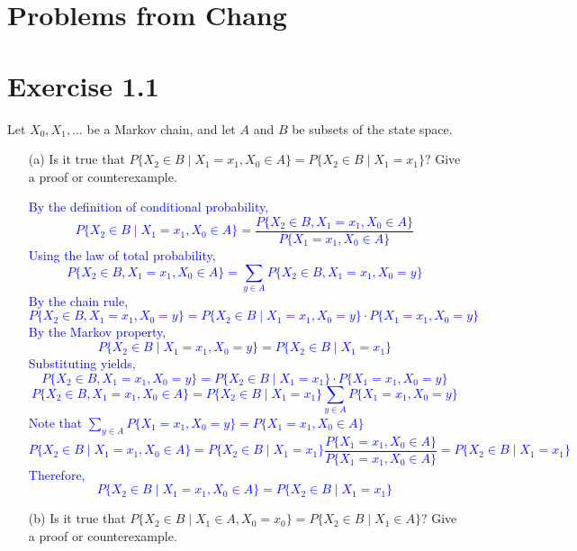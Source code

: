 \documentclass{article}
\begin{document}
\begin{enumerate}
\end{enumerate}

\section*{Problems from Chang}

\section*{Exercise 1.1}
Let $X_0, X_1, \ldots$ be a Markov chain, and let $A$ and $B$ be subsets of the state space.

\begin{enumerate}
    \item[(a)] Is it true that $P\{X_2 \in B \mid X_1 = x_1, X_0 \in A\} = P\{X_2 \in B \mid X_1 = x_1\}$? Give a proof or counterexample.

    \textcolor{blue}{By the definition of conditional probability,
$$P\{X_2 \in B \mid X_1 = x_1, X_0 \in A\} = \frac{P\{X_2 \in B, X_1 = x_1, X_0 \in A\}}{P\{X_1 = x_1, X_0 \in A\}}$$
Using the law of total probability,
$$P\{X_2 \in B, X_1 = x_1, X_0 \in A\} = \sum_{y \in A} P\{X_2 \in B, X_1 = x_1, X_0 = y\}$$
By the chain rule,
$$P\{X_2 \in B, X_1 = x_1, X_0 = y\} = P\{X_2 \in B \mid X_1 = x_1, X_0 = y\} \cdot P\{X_1 = x_1, X_0 = y\}$$
By the Markov property,
$$P\{X_2 \in B \mid X_1 = x_1, X_0 = y\} = P\{X_2 \in B \mid X_1 = x_1\}$$
Substituting yields,
$$P\{X_2 \in B, X_1 = x_1, X_0 = y\} = P\{X_2 \in B \mid X_1 = x_1\} \cdot P\{X_1 = x_1, X_0 = y\}$$
$$P\{X_2 \in B, X_1 = x_1, X_0 \in A\} = P\{X_2 \in B \mid X_1 = x_1\} \sum_{y \in A} P\{X_1 = x_1, X_0 = y\}$$
Note that $\sum_{y \in A} P\{X_1 = x_1, X_0 = y\} = P\{X_1 = x_1, X_0 \in A\}$ \\
$$P\{X_2 \in B \mid X_1 = x_1, X_0 \in A\} = P\{X_2 \in B \mid X_1 = x_1\} \frac{P\{X_1 = x_1, X_0 \in A\}}{P\{X_1 = x_1, X_0 \in A\}} = P\{X_2 \in B \mid X_1 = x_1\}$$
Therefore, $$P\{X_2 \in B \mid X_1 = x_1, X_0 \in A\} = P\{X_2 \in B \mid X_1 = x_1\}$$}


    \item[(b)] Is it true that $P\{X_2 \in B \mid X_1 \in A, X_0 = x_0\} = P\{X_2 \in B \mid X_1 \in A\}$? Give a proof or counterexample.



\end{enumerate}
\end{document}
